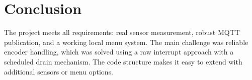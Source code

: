 \documentclass[a4paper,12pt]{article}
\begin{document}
\section{Conclusion}
The project meets all requirements: real sensor measurement, robust MQTT publication, 
and a working local menu system.  
The main challenge was reliable encoder handling, which was solved using a raw interrupt approach with 
a scheduled drain mechanism.  
The code structure makes it easy to extend with additional sensors or menu options.
\end{document}

